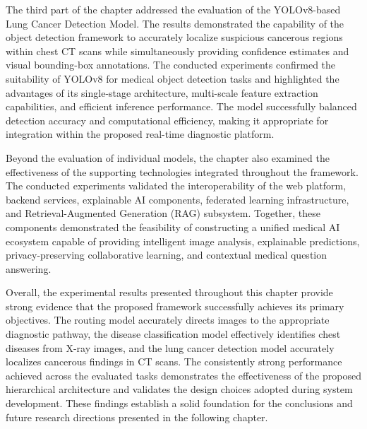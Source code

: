 The third part of the chapter addressed the evaluation of the YOLOv8-based Lung Cancer Detection Model. The results demonstrated the capability of the object detection framework to accurately localize suspicious cancerous regions within chest CT scans while simultaneously providing confidence estimates and visual bounding-box annotations. The conducted experiments confirmed the suitability of YOLOv8 for medical object detection tasks and highlighted the advantages of its single-stage architecture, multi-scale feature extraction capabilities, and efficient inference performance. The model successfully balanced detection accuracy and computational efficiency, making it appropriate for integration within the proposed real-time diagnostic platform.

Beyond the evaluation of individual models, the chapter also examined the effectiveness of the supporting technologies integrated throughout the framework. The conducted experiments validated the interoperability of the web platform, backend services, explainable AI components, federated learning infrastructure, and Retrieval-Augmented Generation (RAG) subsystem. Together, these components demonstrated the feasibility of constructing a unified medical AI ecosystem capable of providing intelligent image analysis, explainable predictions, privacy-preserving collaborative learning, and contextual medical question answering.

Overall, the experimental results presented throughout this chapter provide strong evidence that the proposed framework successfully achieves its primary objectives. The routing model accurately directs images to the appropriate diagnostic pathway, the disease classification model effectively identifies chest diseases from X-ray images, and the lung cancer detection model accurately localizes cancerous findings in CT scans. The consistently strong performance achieved across the evaluated tasks demonstrates the effectiveness of the proposed hierarchical architecture and validates the design choices adopted during system development. These findings establish a solid foundation for the conclusions and future research directions presented in the following chapter.